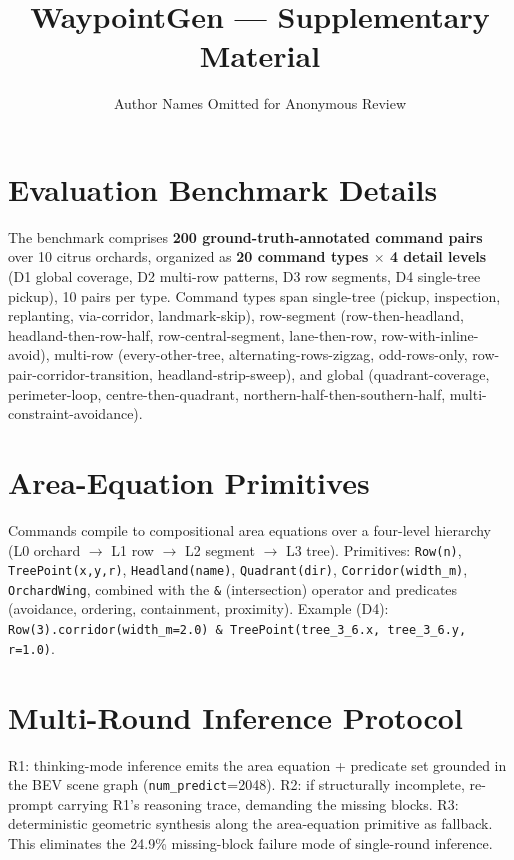 \documentclass{article}
\title{\LARGE\bf WaypointGen --- Supplementary Material}
\author{Author Names Omitted for Anonymous Review}
\begin{document}
\maketitle\thispagestyle{empty}

\section{Evaluation Benchmark Details}
The benchmark comprises \textbf{200 ground-truth-annotated command pairs} over 10 citrus orchards, organized as \textbf{20 command types $\times$ 4 detail levels} (D1 global coverage, D2 multi-row patterns, D3 row segments, D4 single-tree pickup), 10 pairs per type. Command types span single-tree (pickup, inspection, replanting, via-corridor, landmark-skip), row-segment (row-then-headland, headland-then-row-half, row-central-segment, lane-then-row, row-with-inline-avoid), multi-row (every-other-tree, alternating-rows-zigzag, odd-rows-only, row-pair-corridor-transition, headland-strip-sweep), and global (quadrant-coverage, perimeter-loop, centre-then-quadrant, northern-half-then-southern-half, multi-constraint-avoidance).

\section{Area-Equation Primitives}
Commands compile to compositional area equations over a four-level hierarchy (L0 orchard $\to$ L1 row $\to$ L2 segment $\to$ L3 tree). Primitives: \texttt{Row(n)}, \texttt{TreePoint(x,y,r)}, \texttt{Headland(name)}, \texttt{Quadrant(dir)}, \texttt{Corridor(width\_m)}, \texttt{OrchardWing}, combined with the \texttt{\&} (intersection) operator and predicates (avoidance, ordering, containment, proximity). Example (D4): \texttt{Row(3).corridor(width\_m=2.0) \& TreePoint(tree\_3\_6.x, tree\_3\_6.y, r=1.0)}.

\section{Multi-Round Inference Protocol}
R1: thinking-mode inference emits the area equation + predicate set grounded in the BEV scene graph (\texttt{num\_predict}=2048). R2: if structurally incomplete, re-prompt carrying R1's reasoning trace, demanding the missing blocks. R3: deterministic geometric synthesis along the area-equation primitive as fallback. This eliminates the 24.9\% missing-block failure mode of single-round inference.
\end{document}
